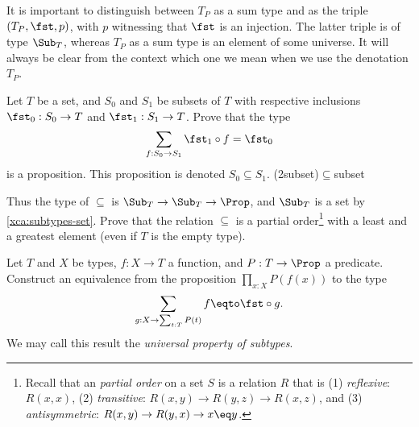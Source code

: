 It is important to distinguish between $T_P$ as a sum type
and as the triple $(T_P,\fst,p)$, with $p$ witnessing that $\fst$
is an injection. The latter triple is of type $\Sub_T$,
whereas $T_P$ as a sum type is an element of some universe.
It will always be clear from the context which one we mean
when we use the denotation $T_P$.

\begin{xca}\label{xca:subsets-inclusion}
  Let $T$ be a set, and $S_0$ and $S_1$ be subsets of $T$ with respective
  inclusions $\fst_0 : S_0 \to T$ and $\fst_1 : S_1 \to T$. Prove that the type%
  \marginnote{%
    \[
      \begin{tikzcd}[ampersand replacement=\&]
        S_0 \ar[rr,dashed,"f"]\ar[dr,"{\fst_0}"'] \& \& S_1\ar[dl,"{\fst_1}"] \\
        \& T \&
      \end{tikzcd}
    \]}
  \begin{displaymath}
    \sum_{f: S_0 \to S_1} \fst_1 \circ f = \fst_0
  \end{displaymath}
  is a proposition. This proposition is denoted $S_0 \subseteq S_1$.
  \glossary(2subset){${\subseteq}$}{subset}

  Thus the type of ${\subseteq}$ is $\Sub_T\to\Sub_T\to\Prop$,
  and $\Sub_T$ is a set by \cref{xca:subtypes-set}.
  Prove that the relation ${\subseteq}$ is a partial
  order\footnote{\label{ft:partial-order}%
  Recall that an \emph{partial order} on a set $S$ is a relation $R$ that is
  (1) \emph{reflexive}: $R(x,x)$,
  (2) \emph{transitive}: $R(x,y) \to R(y,z) \to R(x,z)$, and
  (3) \emph{antisymmetric}: $R(x,y) \to R(y,x) \to x\eq y$.}
with a least and a greatest element (even if $T$ is the empty type).
\end{xca}

\begin{xca}\label{xca:subtype-univ-prop}
  Let $T$ and $X$ be types, $f: X\to T$ a function,
  and $P : T\to\Prop$ a predicate.
  Construct an equivalence from the proposition
  $\prod_{x:X} P(f(x))$ to the type
  \begin{displaymath}
    \sum_{g: X \to \sum_{t:T} P(t)} f \eqto \fst\circ g.
  \end{displaymath}
  We may call this result the \emph{universal property of subtypes}.
\end{xca}



